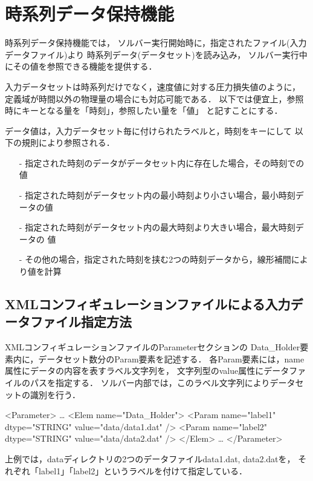 \graphicspath{{./fig_DH/}}
%

\hypertarget{tgt:DH}{\section{時系列データ保持機能}}

時系列データ保持機能では，
ソルバー実行開始時に，指定されたファイル(入力データファイル)より
時系列データ(データセット)を読み込み，
ソルバー実行中にその値を参照できる機能を提供する．

入力データセットは時系列だけでなく，速度値に対する圧力損失値のように，
定義域が時間以外の物理量の場合にも対応可能である．
以下では便宜上，参照時にキーとなる量を「時刻」，参照したい量を「値」
と記すことにする．

データ値は，入力データセット毎に付けられたラベルと，時刻をキーにして
以下の規則により参照される．
\begin{itemize}
\item[-] 指定された時刻のデータがデータセット内に存在した場合，その時刻での値
\item[-] 指定された時刻がデータセット内の最小時刻より小さい場合，最小時刻データの値
\item[-] 指定された時刻がデータセット内の最大時刻より大きい場合，最大時刻データの
値
\item[-] その他の場合，指定された時刻を挟む2つの時刻データから，線形補間により値を計算
\end{itemize}



\subsection{XMLコンフィギュレーションファイルによる入力データファイル指定方法}
XMLコンフィギュレーションファイルのParameterセクションの
Data\_Holder要素内に，データセット数分のParam要素を記述する．
各Param要素には，name属性にデータの内容を表すラベル文字列を，
文字列型のvalue属性にデータファイルのパスを指定する．
ソルバー内部では，このラベル文字列によりデータセットの識別を行う．
{\small
\begin{program}
<Parameter>
  …
  <Elem name="Data_Holder">
    <Param name="label1" dtype="STRING" value="data/data1.dat" />
    <Param name="label2" dtype="STRING" value="data/data2.dat" />
  </Elem>
  …
</Parameter>
\end{program}
}
上例では，dataディレクトリの2つのデータファイルdata1.dat, data2.datを，
それぞれ「label1」「label2」というラベルを付けて指定している．


